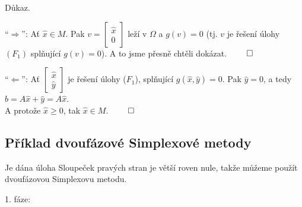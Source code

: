 Důkaz.

\enquote{$\Rightarrow$}: Ať $\hat x \in M$. Pak $v = \begin{bmatrix} \hat x \\ 0 \end{bmatrix}$ leží v $\Omega$ a 
$g(v) = 0$ (tj. $v$ je řešení úlohy $(F_1)$ splňující $g(v) = 0$). A to jsme přesně chtěli dokázat. $\qed$

\enquote{$\Leftarrow$}: Ať $\begin{bmatrix} \hat x \\ \hat y \end{bmatrix}$ je řešení úlohy ($F_1$), splňující 
$g(\hat x, \hat y) = 0$. Pak $\hat y = 0$, a tedy $b = A \hat x + \hat y = A \hat x$. \\ A protože $\hat x \geq 0$, tak 
$\hat x \in M$. $\qed$

\subsection{Příklad dvoufázové Simplexové metody}
Je dána úloha
Sloupeček pravých stran je větší roven nule, takže můžeme použít dvoufázovou Simplexovu metodu.

1. fáze:

